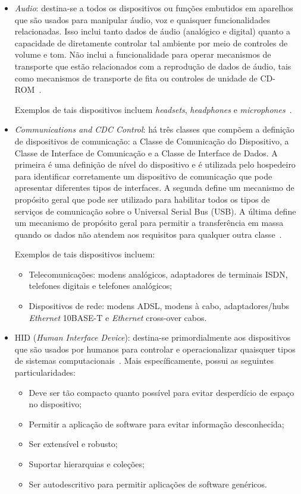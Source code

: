 \begin{itemize}
	\item \emph{Audio}: destina-se a todos os dispositivos ou funções embutidos em aparelhos que são usados para manipular áudio, voz e quaisquer funcionalidades relacionadas. Isso inclui tanto dados de áudio (analógico e digital) quanto a capacidade de diretamente controlar tal ambiente por meio de controles de volume e tom. Não inclui a funcionalidade para operar mecanismos de transporte que estão relacionados com a reprodução de dados de áudio, tais como mecanismos de transporte de fita ou controles de unidade de CD-ROM~\cite{usbaudioclass}.

	Exemplos de tais dispositivos incluem \emph{headsets}, \emph{headphones} e \emph{microphones}~\cite{usbbasicaudioclass}.
	\item \emph{Communications and CDC Control}: há três classes que compõem a definição de dispositivos de comunicação: a Classe de Comunicação do Dispositivo, a Classe de Interface de Comunicação e a Classe de Interface de Dados. A primeira é uma definição de nível do dispositivo e é utilizada pelo hospedeiro para identificar corretamente um dispositivo de comunicação que pode apresentar diferentes tipos de interfaces. A segunda define um mecanismo de propósito geral que pode ser utilizado para habilitar todos os tipos de serviços de comunicação sobre o Universal Serial Bus (USB). A última define um mecanismo de propósito geral para permitir a transferência em massa quando os dados não atendem aos requisitos para qualquer outra classe~\cite{usbcommunicationclass}.

	Exemplos de tais dispositivos incluem:
	\begin{itemize}
		\item Telecomunicações: modens analógicos, adaptadores de terminais ISDN, telefones digitais e telefones analógicos;
		\item Dispositivos de rede: modens ADSL, modens à cabo, adaptadores/hubs \emph{Ethernet} 10BASE-T e \emph{Ethernet} cross-over cabos.
	\end{itemize}
	\item HID (\emph{Human Interface Device}): destina-se primordialmente aos dispositivos que são usados por humanos para controlar e operacionalizar quaisquer tipos de sistemas computacionais~\cite{hid}. Mais específicamente, possui as seguintes particularidades:
	\begin{itemize}
		\item Deve ser tão compacto quanto possível para evitar desperdício de espaço no dispositivo;
		\item Permitir a aplicação de software para evitar informação desconhecida;
		\item Ser extensível e robusto;
		\item Suportar hierarquias e coleções;
		\item Ser autodescritivo para permitir aplicações de software genéricos.
	\end{itemize}


\end{itemize}
